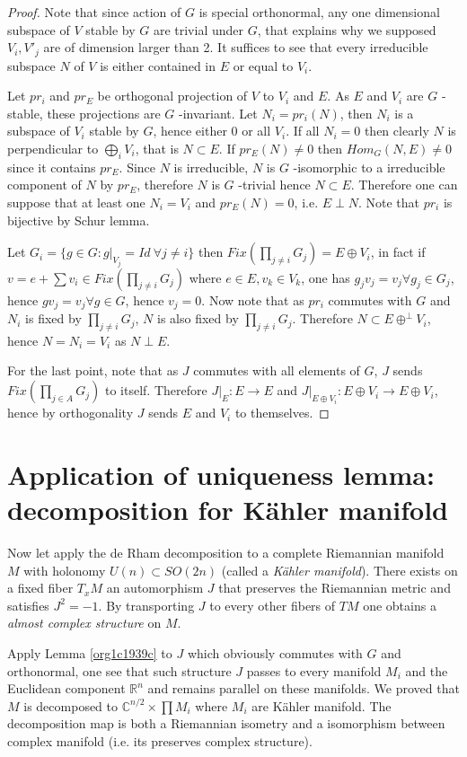 \documentclass[11pt]{article}
\begin{document}
\begin{proof}
Note that since action of \(G\) is special orthonormal, any one dimensional subspace of \(V\) stable by
\(G\) are trivial under \(G\), that explains why we supposed \(V_i, V'_j\) are of dimension larger
than 2. It suffices to see that every irreducible subspace \(N\) of \(V\) is either contained in \(E\) or equal to
\(V_i\).

Let \(pr_i\) and \(pr_E\) be orthogonal projection of \(V\) to \(V_i\) and \(E\). As \(E\) and \(V_i\) are \(G\) -stable, these
projections are \(G\) -invariant. Let \(N_i = pr_i(N)\), then \(N_i\) is a subspace of \(V_i\) stable
by \(G\), hence either \(0\) or all \(V_i\). If all \(N_i=0\) then clearly \(N\) is perpendicular to \(\bigoplus_i
V_i\), that is \(N\subset E\). If \(pr_E(N)\ne 0\) then \(Hom_G(N, E) \ne 0\) since it contains \(pr_E\). Since
\(N\) is irreducible, \(N\) is \(G\) -isomorphic to a irreducible component of \(N\) by \(pr_E\), therefore
\(N\) is \(G\) -trivial hence \(N\subset E\). Therefore one can suppose that at least one \(N_i = V_i\) and
\(pr_E(N) = 0\), i.e. \(E\perp N\). Note that \(pr_i\) is bijective by Schur lemma.

Let \(G_i = \{g\in G: g|_{V_j} = Id\ \forall j\ne i \}\) then \(Fix(\prod_{j\ne i} G_j)= E\oplus V_i\), in fact if \(v = e +\sum v_i\in Fix(\prod_{j\ne i}
G_j)\) where \(e\in E, v_k\in V_k\), one has \(g_j v_j = v_j \forall g_j \in G_j\), hence \(g v_j = v_j
\forall g\in G\), hence \(v_j = 0\). Now note that as \(pr_i\) commutes with \(G\) and \(N_i\) is fixed by
\(\prod_{j\ne i}G_j\), \(N\) is also fixed by \(\prod_{j\ne i}G_j\). Therefore \(N\subset E \oplus^\perp
V_i\), hence \(N = N_i=V_i\) as \(N\perp E\).

For the last point, note that as \(J\) commutes with all elements of \(G\), \(J\) sends \(Fix(\prod_{j\in
A} G_j)\) to itself. Therefore \(J|_E: E\longrightarrow E\) and \(J|_{E\oplus V_i}: E\oplus
V_i\longrightarrow E\oplus V_i\), hence by orthogonality \(J\) sends \(E\) and \(V_i\) to themselves.
\end{proof}


\section{Application of uniqueness lemma: decomposition for Kähler manifold}
\label{sec:org45d2953}
Now let apply the de Rham decomposition to a complete Riemannian manifold \(M\) with holonomy \(U(n)
\subset SO(2n)\) (called a \emph{Kähler manifold}). There exists on a fixed fiber \(T_xM\) an automorphism
\(J\) that preserves the Riemannian metric and satisfies \(J^2 = -1\). By transporting \(J\) to every other
fibers of \(TM\) one obtains a \emph{almost complex structure} on \(M\).

Apply Lemma \ref{org1c1939c} to \(J\) which obviously commutes with \(G\) and orthonormal, one
see that such structure \(J\) passes to every manifold \(M_i\) and the Euclidean component \(\mathbb{R}^n\) and
remains parallel on these manifolds. We proved that \(M\) is decomposed to \(\mathbb{C}^{n/2}\times
\prod M_i\) where \(M_i\) are Kähler manifold. The decomposition map is both a Riemannian isometry and
a isomorphism between complex manifold (i.e. its preserves complex structure). 
\end{document}
